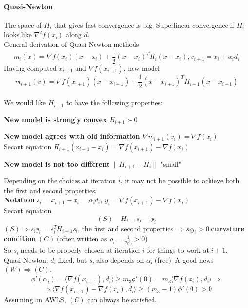 \documentclass[10pt]{report}
\begin{document}
\paragraph{Quasi-Newton} The space of $H_i$ that gives fast convergence is big. Superlinear convergence if $H_i$ looks like $\nabla^2 f(x_i)$ along $d$.\\
General derivation of Quasi-Newton methods $$m_i(x) = \nabla f(x_i)(x-x_i)+\frac{1}{2}(x-x_i)^TH_i(x-x_i), x_{i+1} = x_i+\alpha_id_i$$
Having computed $x_{i+1}$ and $\nabla f(x_{i+1})$, new model
$$m_{i+1}(x) = \nabla f(x_{i+1})(x-x_{i+1})+\frac{1}{2}(x-x_{i+1})^TH_{i+1}(x-x_{i+1})$$\\
We would like $H_{i+1}$ to have the following properties:
\begin{list}{}{}
	\item \textbf{New model is strongly convex} $H_{i+1}\succ 0$
	\item \textbf{New model agrees with old information} $\nabla m_{i+1}(x_i) = \nabla f(x_i)$\\
	Secant equation $H_{i+1}(x_{i+1}-x_i)=\nabla f(x_{i+1})-\nabla f(x_i)$
	\item \textbf{New model is not too different} $\|H_{i+1} - H_i\|$ "small"
\end{list}
Depending on the choices at iteration $i$, it may not be possible to achieve both the first and second properties.\\
\textbf{Notation} $s_i = x_{i+1}- x_i = \alpha_id_i$, $y_i = \nabla f(x_{i+1}) -\nabla f(x_i)$\\
Secant equation 
$$(S)\:\:\:\:\:H_{i+1}s_i = y_i$$
$(S)\Rightarrow s_iy_i = s_i^TH_{i+1}s_i$, the first and second properties $\Rightarrow s_iy_i > 0$ \textbf{curvature condition} $(C)$ (often written as $\rho_i = \frac{1}{y_is_i} > 0$)\\
So $s_i$ needs to be properly chosen at iteration $i$ for things to work at $i+1$.\\
Quasi-Newton: $d_i$ fixed, but $s_i$ also depends on $\alpha_i$ (free). A good news $(W)\Rightarrow (C)$.
$$\phi'(\alpha_i)=\langle\nabla f(x_{i+1}),d_i\rangle\geq m_3\phi'(0)=m_3\langle\nabla f(x_i), d_i\rangle\Rightarrow$$
$$\Rightarrow \langle\nabla f(x_{i+1})-\nabla f(x_i),d_i\rangle\geq (m_3-1)\phi'(0)> 0$$
Assuming an AWLS, $(C)$ can always be satisfied.
\end{document}
